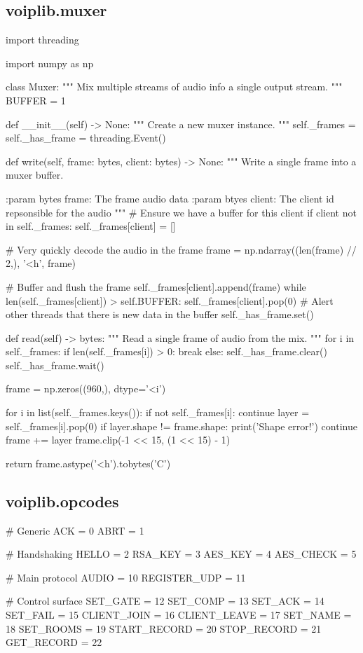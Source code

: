\subsection{voiplib.muxer}
\begin{pythoncode}
import threading

import numpy as np


class Muxer:
    """
    Mix multiple streams of audio info a single output stream.
    """
    BUFFER = 1

    def __init__(self) -> None:
        """
        Create a new muxer instance.
        """
        self._frames = {}
        self._has_frame = threading.Event()

    def write(self, frame: bytes, client: bytes) -> None:
        """
        Write a single frame into a muxer buffer.

        :param bytes frame: The frame audio data
        :param btyes client: The client id repsonsible for the audio
        """
        # Ensure we have a buffer for this client
        if client not in self._frames:
            self._frames[client] = []

        # Very quickly decode the audio in the frame
        frame = np.ndarray((len(frame) // 2,), '<h', frame)

        # Buffer and flush the frame
        self._frames[client].append(frame)
        while len(self._frames[client]) > self.BUFFER:
            self._frames[client].pop(0)
        # Alert other threads that there is new data in the buffer
        self._has_frame.set()

    def read(self) -> bytes:
        """
        Read a single frame of audio from the mix.
        """
        for i in self._frames:
            if len(self._frames[i]) > 0:
                break
        else:
            self._has_frame.clear()
            self._has_frame.wait()

        frame = np.zeros((960,), dtype='<i')

        for i in list(self._frames.keys()):
            if not self._frames[i]:
                continue
            layer = self._frames[i].pop(0)
            if layer.shape != frame.shape:
                print('Shape error!')
                continue
            frame += layer
            frame.clip(-1 << 15, (1 << 15) - 1)

        return frame.astype('<h').tobytes('C')
\end{pythoncode}
\subsection{voiplib.opcodes}
\begin{pythoncode}
# Generic
ACK = 0
ABRT = 1

# Handshaking
HELLO = 2
RSA_KEY = 3
AES_KEY = 4
AES_CHECK = 5

# Main protocol
AUDIO = 10
REGISTER_UDP = 11

# Control surface
SET_GATE = 12
SET_COMP = 13
SET_ACK = 14
SET_FAIL = 15
CLIENT_JOIN = 16
CLIENT_LEAVE = 17
SET_NAME = 18
SET_ROOMS = 19
START_RECORD = 20
STOP_RECORD = 21
GET_RECORD = 22
\end{pythoncode}
